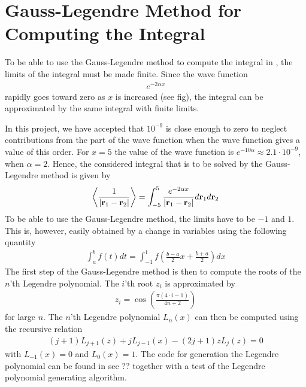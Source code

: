 \section{Gauss-Legendre Method for Computing the Integral}

To be able to use the Gauss-Legendre method to compute the integral in , the limits of the integral must be made  finite.
Since the wave function 
\begin{align}
	e^{-2\alpha x}
\end{align}
rapidly goes toward zero as $x$ is increased (see fig), the integral can be approximated  by the same integral with finite limits.

In this project, we  have accepted that $10^{-9}$ is close enough to zero to neglect contributions from the part of the wave function when the wave function gives a value of this order.
For $x=5$ the value of the wave function is $e^{-10\alpha} \approx 2.1\cdot 10^{-9}$, when $\alpha = 2$.
Hence, the considered integral that is to be solved by the Gauss-Legendre method is given by
\begin{align}
   \left< \frac{1}{| \mbox{\textbf{r}}_1 - \mbox{\textbf{r}}_2 |} \right> 
   = \int _{-5} ^{5} \frac{e^{-2\alpha x}}{| \mbox{\textbf{r}}_1 - \mbox{\textbf{r}}_2 |} d \mbox{\textbf{r}}_1 d\mbox{\textbf{r}}_2
\label{eq:GLdMethod1}
\end{align} 
To be able to use the Gauss-Legendre method, the limits have to be $-1$ and $1$. 
This is, however, easily obtained by a change in variables using the following quantity
\begin{align}
	\int _a ^b f(t) dt = \int _{-1} ^1 f \left( \frac{b-a}{2} x + \frac{b+a}{2} \right) dx
	\label{eq:GLdMethod2}
\end{align} 
The first step of the Gauss-Legendre method is then to compute the roots of the $n$'th Legendre polynomial.
The $i$'th root $z_i$ is approximated by
\begin{align}
	z_i = \cos \left( \frac{\pi (4\cdot i - 1)}{4n+2} \right)
	\label{eq:GLdMethod3}
\end{align} 
for large $n$.
The $n$'th  Legendre polynomial $L_n(x)$ can then be computed using the recursive relation
\begin{align}
	(j+1)L_{j+1} (z) + j L_{j-1} (x) -(2j+1) z L_j (z) = 0
	\label{eq:GLdMethod4}
\end{align} 
with $L_{-1} (x) = 0$ and $L_0 (x) = 1$.
The code for generation the Legendre polynomial can be found in sec ??  together with a test of the Legendre polynomial generating algorithm.

